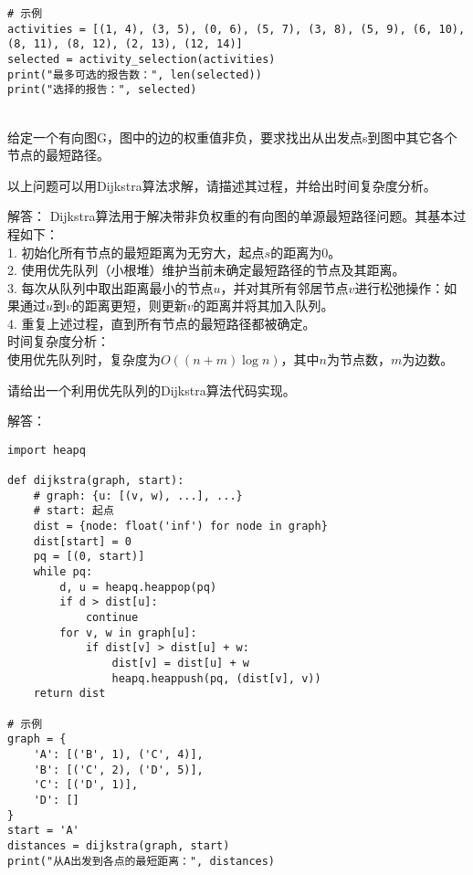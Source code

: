 \documentclass[12pt,twoside]{article}
\begin{document}
\begin{problems}
\begin{verbatim}
# 示例
activities = [(1, 4), (3, 5), (0, 6), (5, 7), (3, 8), (5, 9), (6, 10), (8, 11), (8, 12), (2, 13), (12, 14)]
selected = activity_selection(activities)
print("最多可选的报告数：", len(selected))
print("选择的报告：", selected)
\end{verbatim}

\eparts

\\
给定一个有向图G，图中的边的权重值非负，要求找出从出发点s到图中其它各个节点的最短路径。

\bparts
\ppart 以上问题可以用Dijkstra算法求解，请描述其过程，并给出时间复杂度分析。

解答：
Dijkstra算法用于解决带非负权重的有向图的单源最短路径问题。其基本过程如下：\\
1. 初始化所有节点的最短距离为无穷大，起点$s$的距离为0。\\
2. 使用优先队列（小根堆）维护当前未确定最短路径的节点及其距离。\\
3. 每次从队列中取出距离最小的节点$u$，并对其所有邻居节点$v$进行松弛操作：如果通过$u$到$v$的距离更短，则更新$v$的距离并将其加入队列。\\
4. 重复上述过程，直到所有节点的最短路径都被确定。\\

时间复杂度分析：\\
使用优先队列时，复杂度为$O((n + m)\log n)$，其中$n$为节点数，$m$为边数。

\ppart 请给出一个利用优先队列的Dijkstra算法代码实现。

解答：
\begin{verbatim}
import heapq

def dijkstra(graph, start):
    # graph: {u: [(v, w), ...], ...}
    # start: 起点
    dist = {node: float('inf') for node in graph}
    dist[start] = 0
    pq = [(0, start)]
    while pq:
        d, u = heapq.heappop(pq)
        if d > dist[u]:
            continue
        for v, w in graph[u]:
            if dist[v] > dist[u] + w:
                dist[v] = dist[u] + w
                heapq.heappush(pq, (dist[v], v))
    return dist

# 示例
graph = {
    'A': [('B', 1), ('C', 4)],
    'B': [('C', 2), ('D', 5)],
    'C': [('D', 1)],
    'D': []
}
start = 'A'
distances = dijkstra(graph, start)
print("从A出发到各点的最短距离：", distances)
\end{verbatim}

\eparts

\end{problems}
\end{document}
